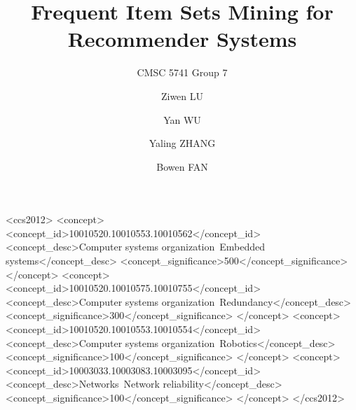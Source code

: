 \documentclass[sigconf,authordraft]{acmart}
\begin{document}
\title{Frequent Item Sets Mining for Recommender Systems}
\subtitle{CMSC 5741 Group 7}

\author{Ziwen LU}

\author{Yan WU}

\author{Yaling ZHANG}

\author{Bowen FAN}



\begin{CCSXML}
<ccs2012>
 <concept>
  <concept_id>10010520.10010553.10010562</concept_id>
  <concept_desc>Computer systems organization~Embedded systems</concept_desc>
  <concept_significance>500</concept_significance>
 </concept>
 <concept>
  <concept_id>10010520.10010575.10010755</concept_id>
  <concept_desc>Computer systems organization~Redundancy</concept_desc>
  <concept_significance>300</concept_significance>
 </concept>
 <concept>
  <concept_id>10010520.10010553.10010554</concept_id>
  <concept_desc>Computer systems organization~Robotics</concept_desc>
  <concept_significance>100</concept_significance>
 </concept>
 <concept>
  <concept_id>10003033.10003083.10003095</concept_id>
  <concept_desc>Networks~Network reliability</concept_desc>
  <concept_significance>100</concept_significance>
 </concept>
</ccs2012>
\end{CCSXML}
\end{document}
